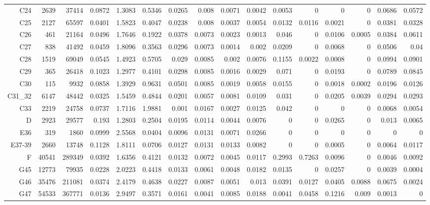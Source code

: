 \begin{table}
\begin{tabular}{rrrrrrrrrrrrrrrr}
C24 & 2639 & 37414 & 0.0872 & 1.3083 & 0.5346 & 0.0265 & 0.008 & 0.0071 & 0.0042 & 0.0053 & 0 & 0 & 0 & 0.0686 & 0.0572 \\
C25 & 2127 & 65597 & 0.0401 & 1.5823 & 0.4047 & 0.0238 & 0.008 & 0.0037 & 0.0054 & 0.0132 & 0.0116 & 0.0021 & 0 & 0.0381 & 0.0328 \\
C26 & 461 & 21164 & 0.0496 & 1.7646 & 0.1922 & 0.0378 & 0.0073 & 0.0023 & 0.0013 & 0.046 & 0 & 0.0106 & 0.0005 & 0.0384 & 0.0611 \\
C27 & 838 & 41492 & 0.0459 & 1.8096 & 0.3563 & 0.0296 & 0.0073 & 0.0014 & 0.002 & 0.0209 & 0 & 0.0068 & 0 & 0.0506 & 0.04 \\
C28 & 1519 & 69049 & 0.0545 & 1.4923 & 0.5705 & 0.029 & 0.0085 & 0.002 & 0.0076 & 0.1155 & 0.0022 & 0.0008 & 0 & 0.0994 & 0.0901 \\
C29 & 365 & 26418 & 0.1023 & 1.2977 & 0.4101 & 0.0298 & 0.0085 & 0.0016 & 0.0029 & 0.071 & 0 & 0.0193 & 0 & 0.0789 & 0.0845 \\
C30 & 115 & 9932 & 0.0858 & 1.3929 & 0.9631 & 0.0501 & 0.0085 & 0.0019 & 0.0058 & 0.0155 & 0 & 0.0018 & 0.0002 & 0.0196 & 0.0126 \\
C31\_32 & 6147 & 48442 & 0.0325 & 1.5459 & 0.4844 & 0.0201 & 0.0057 & 0.0081 & 0.0109 & 0.031 & 0 & 0.0205 & 0.0039 & 0.0294 & 0.0293 \\
C33 & 2219 & 24758 & 0.0737 & 1.7116 & 1.9881 & 0.001 & 0.0167 & 0.0027 & 0.0125 & 0.042 & 0 & 0 & 0 & 0.0068 & 0.0054 \\
D & 2923 & 29577 & 0.193 & 1.2803 & 0.2504 & 0.0195 & 0.0114 & 0.0044 & 0.0076 & 0 & 0 & 0.0265 & 0 & 0.013 & 0.0065 \\
E36 & 319 & 1860 & 0.0999 & 2.5568 & 0.0404 & 0.0096 & 0.0131 & 0.0071 & 0.0266 & 0 & 0 & 0 & 0 & 0 & 0 \\
E37-39 & 2660 & 13748 & 0.1128 & 1.8111 & 0.0706 & 0.0127 & 0.0131 & 0.0133 & 0.0082 & 0 & 0 & 0.0005 & 0 & 0.0064 & 0.0117 \\
F & 40541 & 289349 & 0.0392 & 1.6356 & 0.4121 & 0.0132 & 0.0072 & 0.0045 & 0.0117 & 0.2993 & 0.7263 & 0.0096 & 0 & 0.0046 & 0.0092 \\
G45 & 12773 & 79935 & 0.0228 & 2.0223 & 0.4418 & 0.0133 & 0.0061 & 0.0048 & 0.0182 & 0.0135 & 0 & 0.0257 & 0 & 0.0039 & 0.0004 \\
G46 & 35476 & 211081 & 0.0374 & 2.4179 & 0.4638 & 0.0227 & 0.0087 & 0.0051 & 0.013 & 0.0391 & 0.0127 & 0.0405 & 0.0088 & 0.0675 & 0.0024 \\
G47 & 54533 & 367771 & 0.0136 & 2.9497 & 0.3571 & 0.0161 & 0.0041 & 0.0085 & 0.0188 & 0.0041 & 0.0458 & 0.1216 & 0.009 & 0.0013 & 0 \\

\end{tabular}
\end{table}
